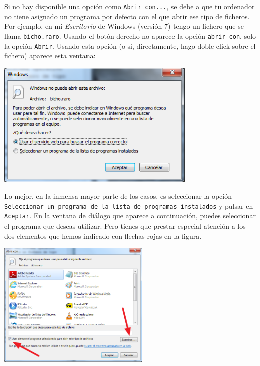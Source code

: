 \documentclass[10pt,a4paper]{article}\usepackage[]{graphicx}\usepackage[]{color}
\newcounter {cont01}
\begin{document}
Si no hay disponible una opción como {\tt Abrir con...}, se debe a que tu ordenador no tiene
asignado un programa por defecto con el que abrir ese tipo de ficheros. Por ejemplo, en mi {\em
Escritorio} de Windows (versión 7) tengo un fichero que se llama {\tt bicho.raro}. Usando el botón
derecho no aparece la opción {\tt abrir con}, solo la opción {\tt Abrir}. Usando esta opción (o si,
directamente, hago doble click sobre el fichero) aparece esta ventana:
    \begin{center}
    \includegraphics[height=6cm]{../fig/Tut00-AbriendoBichoRaro.png}
    \end{center}
Lo mejor, en la inmensa mayor parte de los casos, es seleccionar la opción {\tt Seleccionar un
programa de la lista de programas instalados} y pulsar en {\tt Aceptar}. En la ventana de diálogo
que aparece a continuación, puedes seleccionar el programa que deseas utilizar. Pero tienes que
prestar especial atención a los dos elementos que hemos indicado con flechas rojas en la figura.

    \begin{center}
    \includegraphics[height=6cm]{../fig/Tut00-SeleccionandoProgramaPredeterminado.png}
    \end{center}
\end{document}
